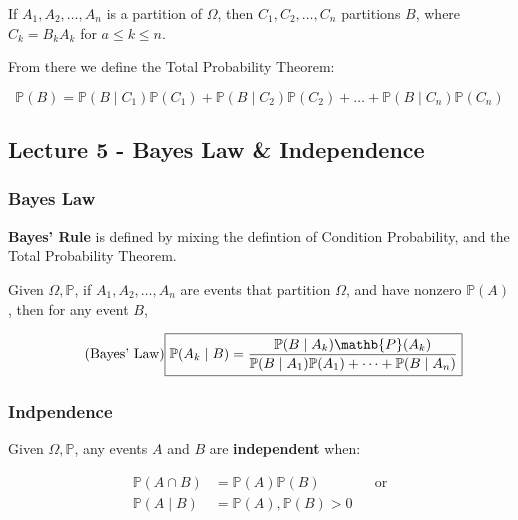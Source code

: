 \documentclass{article}
\begin{document}
If $A_1, A_2, \dots, A_n$ is a partition of $\Omega$, then $C_1, C_2,
\dots, C_n$ partitions $B$, where $C_k = B_k A_k$ for $a \leq k \leq
n$.

From there we define the Total Probability Theorem:

\begin{equation}
  \tag{Total Probability Theorem}
  \boxed{
    \mathbb{P}(B) = \mathbb{P}(B \mid C_1) \mathbb{P}(C_1) +
    \mathbb{P}(B \mid C_2) \mathbb{P}(C_2) + \dots + \mathbb{P}(B \mid
    C_n) \mathbb{P}(C_n)
  }
\end{equation}


\subsection{Lecture 5 - Bayes Law \& Independence}

\subsubsection{Bayes Law}

\textbf{Bayes' Rule} is defined by mixing the defintion of Condition
Probability, and the Total Probability Theorem.

Given $\Omega, \mathbb{P}$, if $A_1, A_2, \dots, A_n$ are events that
partition $\Omega$, and have nonzero $\mathbb{P}(A)$, then for any
event $B$,

\begin{equation}
  \tag{Bayes' Law}
  \boxed{
    \mathbb{P}(A_k \mid B) =
    \frac{\mathbb{P}(B \mid A_k) \mathb{P}(A_k)}
    {\mathbb{P}(B \mid A_1) \mathbb{P}(A_1) + \dots + \mathbb{P}(B
      \mid A_n)}
  }
\end{equation}

\subsubsection{Indpendence}

Given $\Omega, \mathbb{P}$, any events $A$ and $B$ are
\textbf{independent} when:

\begin{equation}
  \tag{Independence Def}
  \boxed{
    \begin{aligned}
      \mathbb{P}(A \cap B)
      &= \mathbb{P}(A) \mathbb{P}(B)
      && \text{or} \\
      \mathbb{P}(A \mid B)
      &= \mathbb{P}(A), \mathbb{P}(B) > 0
    \end{aligned}
  }
\end{equation}
\end{document}
